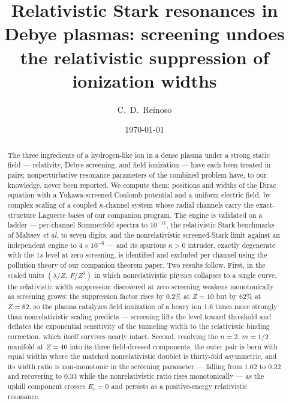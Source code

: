 \documentclass[aps,pra,twocolumn,superscriptaddress,floatfix,longbibliography]{revtex4-2}
\begin{document}
\title{Relativistic Stark resonances in Debye plasmas: screening undoes
the relativistic suppression of ionization widths}

\author{C.~D.~Reinoso}

\date{\today}

\begin{abstract}
The three ingredients of a hydrogen-like ion in a dense plasma under a
strong static field --- relativity, Debye screening, and field
ionization --- have each been treated in pairs; nonperturbative
resonance parameters of the combined problem have, to our knowledge,
never been reported. We compute them: positions and widths of the
Dirac equation with a Yukawa-screened Coulomb potential and a uniform
electric field, by complex scaling of a coupled $\kappa$-channel
system whose radial channels carry the exact-structure Laguerre bases
of our companion program. The engine is validated on a ladder ---
per-channel Sommerfeld spectra to $10^{-11}$, the relativistic Stark
benchmarks of Maltsev \emph{et al.} to seven digits, and the
nonrelativistic screened-Stark limit against an independent engine to
$4\times10^{-6}$ --- and its spurious $\kappa>0$ intruder, exactly
degenerate with the $1s$ level at zero screening, is identified and
excluded per channel using the pollution theory of our companion
theorem paper. Two results follow. First, in the scaled units
$(\lambda/Z,\,F/Z^{3})$ in which nonrelativistic physics collapses to
a single curve, the relativistic width suppression discovered at zero
screening weakens monotonically as screening grows: the suppression
factor rises by $0.2\%$ at $Z=10$ but by $62\%$ at $Z=82$, so the
plasma catalyzes field ionization of a heavy ion $1.6$ times more
strongly than nonrelativistic scaling predicts --- screening lifts
the level toward threshold and deflates the exponential sensitivity
of the tunneling width to the relativistic binding correction, which
itself survives nearly intact. Second, resolving the $n=2$, $m=1/2$
manifold at $Z=40$ into its three field-dressed components, the
outer pair is born with equal widths where the matched
nonrelativistic doublet is thirty-fold asymmetric, and its width
ratio is non-monotonic in the screening parameter --- falling from
$1.02$ to $0.22$ and recovering to $0.33$ while the nonrelativistic
ratio rises monotonically --- as the uphill component crosses
$E_r=0$ and persists as a positive-energy relativistic resonance.
\end{abstract}
\end{document}
